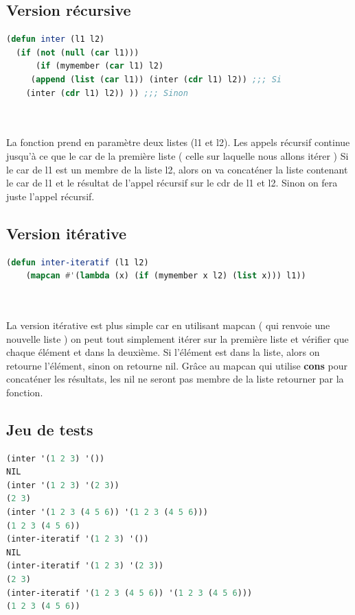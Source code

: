 \documentclass[a4paper,10pt]{report}
\begin{document}
    
      \subsection{Version récursive}
	\begin{lstlisting}[language=Lisp]
(defun inter (l1 l2)
  (if (not (null (car l1)))
      (if (mymember (car l1) l2)
	 (append (list (car l1)) (inter (cdr l1) l2)) ;;; Si
	(inter (cdr l1) l2)) )) ;;; Sinon
	
	
	\end{lstlisting}

      La fonction prend en paramètre deux listes (l1 et l2). Les appels récursif continue jusqu'à ce que le car de la première liste ( celle sur laquelle nous allons itérer )
      Si le car de l1 est un membre de la liste l2, alors on va concaténer la liste contenant le car de l1 et le résultat de l'appel récursif sur le cdr de l1 et l2. Sinon
      on fera juste l'appel récursif. \newline
      
      
      \subsection{Version itérative}
      
	\begin{lstlisting}[language=Lisp]
(defun inter-iteratif (l1 l2)
    (mapcan #'(lambda (x) (if (mymember x l2) (list x))) l1))

    
    \end{lstlisting}

      La version itérative est plus simple car en utilisant mapcan ( qui renvoie une nouvelle liste ) on peut tout simplement itérer sur la première liste et vérifier que chaque élément et dans la deuxième.
      Si l'élément est dans la liste, alors on retourne l'élément, sinon on retourne nil. Grâce au mapcan qui utilise \textbf{cons} pour concaténer les résultats, les nil ne seront pas membre de la liste retourner par la fonction.
      \vspace{1cm}
	  \subsection{Jeu de tests}
	   \begin{lstlisting}[language=Lisp]
(inter '(1 2 3) '())
NIL	      
(inter '(1 2 3) '(2 3))
(2 3)	   
(inter '(1 2 3 (4 5 6)) '(1 2 3 (4 5 6)))
(1 2 3 (4 5 6))
(inter-iteratif '(1 2 3) '())
NIL	      
(inter-iteratif '(1 2 3) '(2 3))
(2 3)	   
(inter-iteratif '(1 2 3 (4 5 6)) '(1 2 3 (4 5 6)))
(1 2 3 (4 5 6))
		 \end{lstlisting}
\end{document}
